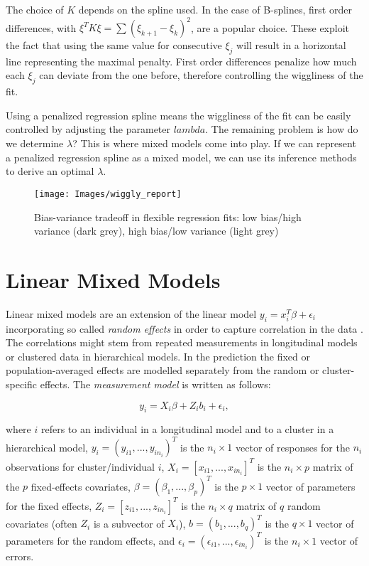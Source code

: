 \documentclass[12pt]{article}
\begin{document}
The choice of $K$ depends on the spline used. In the case of B-splines, first order differences, with $\xi^TK\xi = \sum(\xi_{k+1} - \xi_{k})^2$, are a popular choice. These exploit the fact that using the same value for consecutive $\xi_j$ will result in a horizontal line representing the maximal penalty. First order differences penalize how much each $\xi_j$ can deviate from the one before, therefore controlling the wiggliness of the fit.

Using a penalized regression spline means the wiggliness of the fit can be easily controlled by adjusting the parameter $lambda$. The remaining problem is how do we determine $\lambda$? This is where mixed models come into play. If we can represent a penalized regression spline as a mixed model, we can use its inference methods to derive an optimal $\lambda$.


\begin{figure}
\begin{center}
\texttt{[image: Images/wiggly\_report]}
\end{center}
\vspace{-2em}
\caption[caption]{Bias-variance tradeoff in flexible regression fits: low bias/high variance (dark grey), high bias/low variance (light grey)}\label{wiggly}
\end{figure}



\section{Linear Mixed Models}\label{lmm}

Linear mixed models are an extension of the linear model $y_i = x^T_i\beta +\epsilon_i$ incorporating so called \textit{random effects} in order to capture correlation in the data \cite{fahrmeir2013regression}. The correlations might stem from repeated measurements in longitudinal models or clustered data in hierarchical models. In the prediction the fixed or population-averaged effects are modelled separately from the random or cluster-specific effects. The \textit{measurement model} is written as follows:

$$y_i = X_i \beta + Z_i b_i + \epsilon_i,$$

where $i$ refers to an individual in a longitudinal model and to a cluster in a
hierarchical model, $y_i = ( y_{i1},...,y_{in_i} )^T$ is the $n_i \times 1$ vector of responses for the $n_i$ observations for cluster/individual $i$, $X_i = \left[ x_{i1},..., x_{in_i}\right]^T$ is the $n_i \times p$ matrix of the $p$ fixed-effects covariates, $\beta = (\beta_1,...,\beta_p)^T$ is the $p\times1$ vector of parameters for the fixed effects, $Z_i = \left[z_{i1},...,z_{in_i}\right]^T$ is the $n_i\times q$ matrix of $q$ random covariates (often $Z_i$ is a subvector of $X_i$), $b = (b_1,...,b_q)^T$ is the $q\times1$ vector of parameters for the random effects, and $\epsilon_i = (\epsilon_{i1},...,\epsilon_{in_i})^T$ is the $n_i\times1$ vector of errors.
\end{document}
